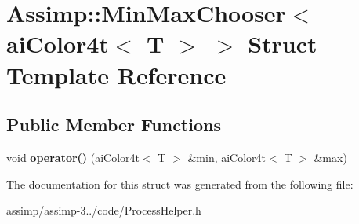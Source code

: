 \hypertarget{struct_assimp_1_1_min_max_chooser_3_01ai_color4t_3_01_t_01_4_01_4}{\section{Assimp\+:\+:Min\+Max\+Chooser$<$ ai\+Color4t$<$ T $>$ $>$ Struct Template Reference}
\label{struct_assimp_1_1_min_max_chooser_3_01ai_color4t_3_01_t_01_4_01_4}
}
\subsection*{Public Member Functions}
\begin{DoxyCompactItemize}
\item 
\hypertarget{struct_assimp_1_1_min_max_chooser_3_01ai_color4t_3_01_t_01_4_01_4_aa69ef4b465f18f388e4d5bc629a33b09}{void {\bfseries operator()} (ai\+Color4t$<$ T $>$ \&min, ai\+Color4t$<$ T $>$ \&max)}\label{struct_assimp_1_1_min_max_chooser_3_01ai_color4t_3_01_t_01_4_01_4_aa69ef4b465f18f388e4d5bc629a33b09}

\end{DoxyCompactItemize}


The documentation for this struct was generated from the following file\+:\begin{DoxyCompactItemize}
\item 
assimp/assimp-\/3../code/Process\+Helper.\+h\end{DoxyCompactItemize}

